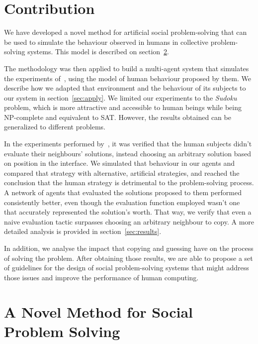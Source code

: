 \documentclass{article}
\begin{document}
\section{Contribution}

We have developed a novel method for artificial social problem-solving that can be used to simulate the behaviour observed in humans in collective problem-solving systems. This model is described on section~\ref{sec:model}.

The methodology was then applied to build a multi-agent system that simulates the experiments of~\cite{farenzena:collabem}, using the model of human behaviour proposed by them. We describe how we adapted that environment and the behaviour of its subjects to our system in section~\ref{sec:apply}. We limited our experiments to the {\em Sudoku} problem, which is more attractive and accessible to human beings while being NP-complete and equivalent to SAT. However, the results obtained can be generalized to different problems.

In the experiments performed by~\cite{farenzena:collabem}, it was verified that the human subjects didn't evaluate their neighbours' solutions, instead choosing an arbitrary solution based on position in the interface. We simulated that behaviour in our agents and compared that strategy with alternative, artificial strategies, and reached the conclusion that the human strategy is detrimental to the problem-solving process. A network of agents that evaluated the solutions proposed to them performed consistently better, even though the evaluation function employed wasn't one that accurately represented the solution's worth. That way, we verify that even a naive evaluation tactic surpasses choosing an arbitrary neighbour to copy. A more detailed analysis is provided in section~\ref{sec:results}.

In addition, we analyse the impact that copying and guessing have on the process of solving the problem. After obtaining those results, we are able to propose a set of guidelines for the design of social problem-solving systems that might address those issues and improve the performance of human computing.

\section{A Novel Method for %
Social Problem Solving}
\label{sec:model}
\end{document}
